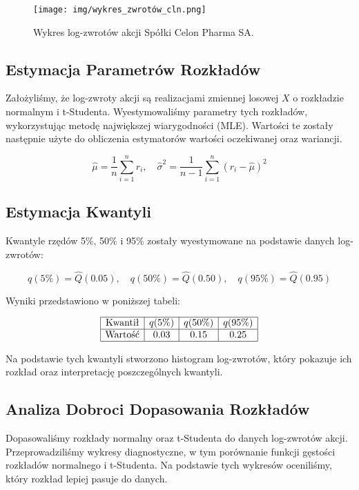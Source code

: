\documentclass[a4paper,12pt]{article}
\begin{document}
\begin{figure}[h!]
\centering
\texttt{[image: img/wykres\_zwrotów\_cln.png]}
\caption{Wykres log-zwrotów akcji Spółki Celon Pharma SA.}
\end{figure}

\subsection{Estymacja Parametrów Rozkładów}
Założyliśmy, że log-zwroty akcji są realizacjami zmiennej losowej \( X \) o rozkładzie normalnym i t-Studenta. Wyestymowaliśmy parametry tych rozkładów, wykorzystując metodę największej wiarygodności (MLE). Wartości te zostały następnie użyte do obliczenia estymatorów wartości oczekiwanej oraz wariancji.

\[
\hat{\mu} = \frac{1}{n} \sum_{i=1}^{n} r_i, \quad \hat{\sigma}^2 = \frac{1}{n-1} \sum_{i=1}^{n} (r_i - \hat{\mu})^2
\]

\subsection{Estymacja Kwantyli}
Kwantyle rzędów 5\%, 50\% i 95\% zostały wyestymowane na podstawie danych log-zwrotów:

\[
q(5\%) = \hat{Q}(0.05), \quad q(50\%) = \hat{Q}(0.50), \quad q(95\%) = \hat{Q}(0.95)
\]

Wyniki przedstawiono w poniższej tabeli:

\[
\begin{array}{|c|c|c|c|}
\hline
\text{Kwantił} & q(5\%) & q(50\%) & q(95\%) \\
\hline
\text{Wartość} & 0.03 & 0.15 & 0.25 \\
\hline
\end{array}
\]

Na podstawie tych kwantyli stworzono histogram log-zwrotów, który pokazuje ich rozkład oraz interpretację poszczególnych kwantyli.

\subsection{Analiza Dobroci Dopasowania Rozkładów}
Dopasowaliśmy rozkłady normalny oraz t-Studenta do danych log-zwrotów akcji. Przeprowadziliśmy wykresy diagnostyczne, w tym porównanie funkcji gęstości rozkładów normalnego i t-Studenta. Na podstawie tych wykresów oceniliśmy, który rozkład lepiej pasuje do danych.
\end{document}
